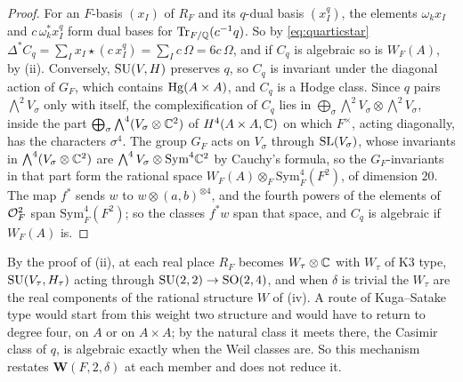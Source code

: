 \begin{proof}
For an $F$-basis $(x_{I})$ of $R_{F}$ and its $q$-dual basis $(x_{I}^{q})$, the
elements $\omega_{k}x_{I}$ and $c\,\omega_{k}^{*}x_{I}^{q}$ form dual bases for
$\operatorname{Tr}_{F/\mathbb{Q}}(c^{-1}q)$. So by \eqref{eq:quarticstar}
$\Delta^{*}C_{q}=\sum_{I}x_{I}\star(c\,x_{I}^{q})=\sum_{I}c\,\Omega=6c\,\Omega$,
and if $C_{q}$ is algebraic so is $W_{F}(A)$, by (ii).
Conversely, $\operatorname{SU}(V,H)$ preserves $q$, so $C_{q}$ is invariant under the
diagonal action of $G_{F}$, which contains $\operatorname{Hg}(A\times A)$, and $C_{q}$ is a
Hodge class. Since $q$ pairs $\bigwedge^{2}V_{\sigma}$ only with itself, the
complexification of $C_{q}$ lies in $\bigoplus_{\sigma}\bigwedge^{2}V_{\sigma}
\otimes\bigwedge^{2}V_{\sigma}$, inside the part
$\bigoplus_{\sigma}\bigwedge^{4}(V_{\sigma}\otimes\mathbb{C}^{2})$ of
$H^{4}(A\times A,\mathbb{C})$ on which $F^{\times}$, acting diagonally, has the
characters $\sigma^{4}$. The group $G_{F}$ acts on $V_{\sigma}$ through
$\operatorname{SL}(V_{\sigma})$, whose invariants in $\bigwedge^{4}(V_{\sigma}\otimes\mathbb{C}^{2})$
are $\bigwedge^{4}V_{\sigma}\otimes\mathrm{Sym}^{4}\mathbb{C}^{2}$ by Cauchy's
formula, so the $G_{F}$-invariants in that part form the rational space
$W_{F}(A)\otimes_{F}\mathrm{Sym}^{4}_{F}(F^{2})$, of dimension $20$. The map
$f^{*}$ sends $w$ to $w\otimes(a,b)^{\otimes4}$, and the fourth powers of the
elements of $\mathcal{O}_{F}^{2}$ span $\mathrm{Sym}^{4}_{F}(F^{2})$; so the classes
$f^{*}w$ span that space, and $C_{q}$ is algebraic if $W_{F}(A)$ is.
\end{proof}

\begin{remark}\label{rem:quarticisogeny}
By the proof of (ii), at each real place $R_{F}$ becomes
$W_{\tau}\otimes\mathbb{C}$ with $W_{\tau}$ of K3 type, $\operatorname{SU}(V_{\tau},H_{\tau})$ acting
through $\operatorname{SU}(2,2)\to\mathrm{SO}(2,4)$, and when $\delta$ is trivial the
$W_{\tau}$ are the real components of the rational structure $W$ of
(iv). A route of Kuga--Satake type would start from
this weight two structure and would have to return to degree four, on $A$ or
on $A\times A$; by  the natural class it meets
there, the Casimir class of $q$, is algebraic exactly when the Weil classes
are. So this mechanism restates $\mathbf{W}(F,2,\delta)$ at each member and
does not reduce it.
\end{remark}


